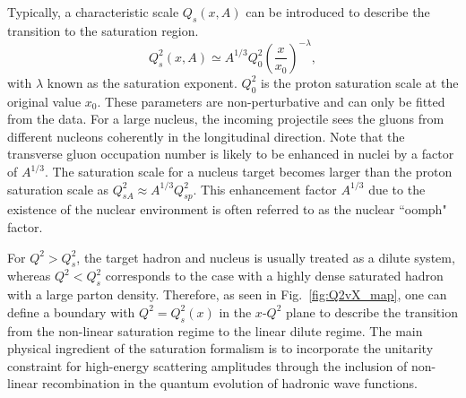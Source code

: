 Typically, a characteristic scale $Q_{s}(x,A)$ can
be introduced to describe the transition to the saturation region. 
\begin{equation}
Q^{2}_{s}(x,A)\simeq A^{1/3} Q^{2}_{0}(\frac{x}{x_{0}})^{-\lambda},
\label{eqn:sat_scale}
\end{equation}
with $\lambda$ known as the saturation exponent. $Q^{2}_{0}$ is the proton
saturation scale at the original value $x_{0}$. These parameters are
non-perturbative and can only be fitted from the data. 
For a large nucleus, the incoming projectile sees the gluons from different nucleons coherently in the longitudinal direction. Note that the transverse gluon occupation number is likely to be enhanced in nuclei by a factor of $A^{1/3}$.
The saturation scale for a nucleus target becomes larger than the proton saturation scale as
$Q_{sA}^{2}\approx A^{1/3}Q^{2}_{sp}$. This enhancement factor $A^{1/3}$ due to
the existence of the nuclear environment is often referred to as the nuclear
``oomph" factor.

For $Q^{2}>Q_{s}^{2}$, the target hadron and nucleus is usually treated as a dilute system,
whereas $Q^{2}<Q_{s}^{2}$ corresponds to the case with a highly dense saturated
hadron with a large parton density. Therefore, as seen in
Fig.~\ref{fig:Q2vX_map}, one can define a boundary with $Q^2=Q_s^2(x)$ in the
$x\textrm{-}Q^2$ plane to describe the transition from the non-linear saturation
regime to the linear dilute regime. The main physical ingredient of the
saturation formalism is to incorporate the unitarity constraint for high-energy
scattering amplitudes through the inclusion of non-linear recombination in the
quantum evolution of hadronic wave functions.


